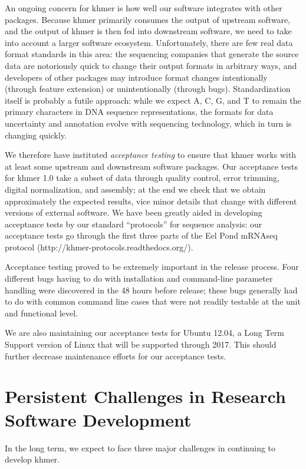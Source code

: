 \documentclass[12pt]{article}
\begin{document}
An ongoing concern for khmer is how well our software integrates with
other packages.  Because khmer primarily consumes the output of
upstream software, and the output of khmer is then fed into downstream
software, we need to take into account a larger software ecosystem.
Unfortunately, there are few real data format standards in this area:
the sequencing companies that generate the source data are notoriously
quick to change their output formats in arbitrary ways, and developers
of other packages may introduce format changes intentionally (through
feature extension) or unintentionally (through bugs).  Standardization
itself is probably a futile approach: while we expect A, C, G, and
T to remain the primary characters in DNA sequence representations,
the formats for data uncertainty and annotation evolve with
sequencing technology, which in turn is changing quickly.

We therefore have instituted {\em acceptance testing} to ensure that
khmer works with at least some upstream and downstream software
packages.  Our acceptance tests for khmer 1.0 take a subset of data
through quality control, error trimming, digital normalization, and
assembly; at the end we check that we obtain approximately the
expected results, vice minor details that change with different
versions of external software.  We have been greatly aided in
developing acceptance tests by our standard ``protocols'' for sequence
analysis: our acceptance tests go through the first three parts of the
Eel Pond mRNAseq protocol (http://khmer-protocols.readthedocs.org/).

Acceptance testing proved to be extremely important in the release
process.  Four different bugs having to do with installation and
command-line parameter handling were discovered in the 48 hours before
release; these bugs generally had to do with common command line cases
that were not readily testable at the unit and functional level.

We are also maintaining our acceptance tests for Ubuntu 12.04, a Long
Term Support version of Linux that will be supported through 2017.
This should further decrease maintenance efforts for our acceptance
tests.

\section{Persistent Challenges in Research Software Development}

In the long term, we expect to face three major challenges in continuing
to develop khmer.
\end{document}
